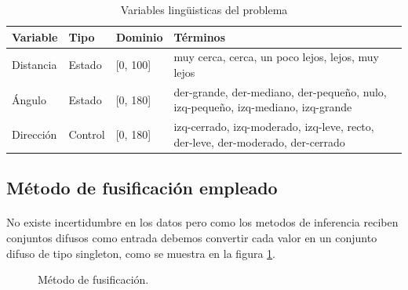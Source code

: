 \documentclass[a4paper,10pt,twocolumn]{article}
\begin{document}
\begin{table}[htb]%
	\begin{center}
		 \begin{tabular}{| l | l | l |p{4.6cm} |}
			  \hline
			    Variable & Tipo & Dominio & Términos \\ \hline
			    Distancia & Estado & [0, 100] & muy cerca, cerca, un poco lejos, lejos, muy lejos \\ \hline
			    Ángulo & Estado & [0, 180] & der-grande, der-mediano, \newline der-pequeño, nulo, izq-pequeño, izq-mediano, izq-grande \\ \hline
			    Dirección & Control & [0, 180] & izq-cerrado, izq-moderado, \newline izq-leve, recto, der-leve, \newline der-moderado, der-cerrado \\ \hline
		  \end{tabular}		  
		  \caption{Variables lingüisticas del problema  \label{tab:lv}}%
	\end{center}
\end{table}

\subsection{Método de fusificación empleado}\label{sub:fuzzification}
\paragraph{} No existe incertidumbre en los datos pero como los metodos de inferencia reciben conjuntos difusos como entrada debemos convertir cada valor
en un conjunto difuso de tipo singleton, como se muestra en la figura \ref{fig:fuzzification}.

\begin{figure}[htb]%
	\begin{center}
	\end{center}
	\caption{Método de fusificación.\label{fig:fuzzification}}%
\end{figure}
\end{document}
